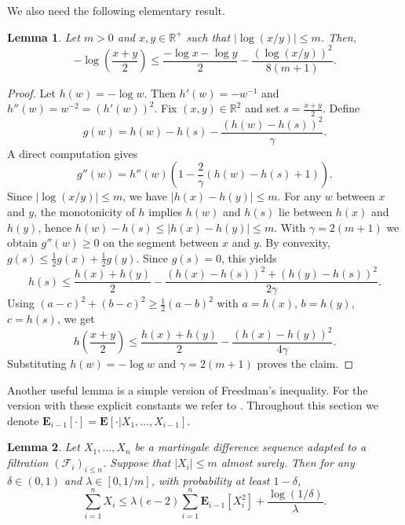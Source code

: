\documentclass[11pt]{article}
\newcommand{\R}{\mathbb R}
\newcommand{\E}{{\mathbf E}}
\renewcommand{\le}{\leqslant}
\renewcommand{\ge}{\geqslant}
\newtheorem{lemma}{Lemma}
\theoremstyle{definition}
\theoremstyle{remark}
\begin{document}
We also need the following elementary result.
\begin{lemma}
\label{lem:logloss-Tstyle}
Let $m>0$ and $x, y \in \R^+$ such that 
$\left|\log\left(x/y\right)\right|\le m$.
Then, 
\begin{equation}\label{eq:mid-log}
-\log\left(\frac{x+y}{2}\right)
\le
\frac{-\log x-\log y}{2}
-
\frac{\left(\log\left(x/y\right)\right)^2}{8(m+1)}.
\end{equation}
\end{lemma}

\begin{proof}
Let $h(w)=-\log w$. Then $h'(w)=-w^{-1}$ and $h''(w)=w^{-2}=(h'(w))^2$.
Fix $(x,y)\in \R^2$ and set $s=\frac{x+y}{2}$. Define
\[
g(w)=h(w)-h(s)-\frac{\left(h(w)-h(s)\right)^2}{\gamma}.
\]
A direct computation gives
\[
g''(w)=h''(w)\left(1-\frac{2}{\gamma}\left(h(w)-h(s)+1\right)\right).
\]
Since $\left|\log\left(x/y\right)\right|\le m$, we have $\left|h(x)-h(y)\right|\le m$. For any $w$ between $x$ and $y$, the monotonicity of $h$ implies $h(w)$ and $h(s)$ lie between $h(x)$ and $h(y)$, hence $h(w)-h(s)\le \left|h(x)-h(y)\right|\le m$. With $\gamma=2(m+1)$ we obtain $g''(w)\ge 0$ on the segment between $x$ and $y$. By convexity, $g(s)\le \frac{1}{2}g(x)+\frac{1}{2}g(y)$. Since $g(s)=0$, this yields
\[
h(s)\le \frac{h(x)+h(y)}{2}-\frac{\left(h(x)-h(s)\right)^2+\left(h(y)-h(s)\right)^2}{2\gamma}.
\]
Using $\left(a-c\right)^2+\left(b-c\right)^2\ge \frac{1}{2}\left(a-b\right)^2$ with $a=h(x)$, $b=h(y)$, $c=h(s)$, we get
\[
h\left(\frac{x+y}{2}\right)\le \frac{h(x)+h(y)}{2}-\frac{\left(h(x)-h(y)\right)^2}{4\gamma}.
\]
Substituting $h(w)=-\log w$ and $\gamma=2(m+1)$ proves the claim.
\end{proof}
Another useful lemma is a simple version of Freedman's inequality. For the version with these explicit constants we refer to \cite[Theorem 1]{beygelzimer2011contextual}. Throughout this section we denote $\E_{i - 1}[\cdot] = \E[\cdot |X_1, \ldots, X_{i - 1}]$.

\begin{lemma}
\label{lem:freedman}
Let $X_1, \ldots, X_n$ be a martingale difference sequence adapted to a filtration $(\mathcal{F}_i)_{i \le n}$. Suppose that $|X_i| \le m$ almost surely. Then for any $\delta \in (0, 1)$ and $\lambda \in [0, 1/m]$, with probability at least $1 - \delta$,
\[
\sum\limits_{i = 1}^n X_i \le \lambda(e - 2)\sum\limits_{i = 1}^n\E_{i - 1}[X_i^2] + \frac{\log(1/\delta)}{\lambda}.
\]
\end{lemma}
\end{document}
